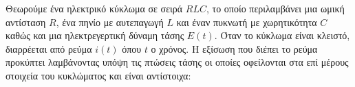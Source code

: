 \documentclass[a4paper,table]{report}
\begin{document}

\begin{center}
  \minibox{\large\bfseries \textcolor{Col1}{Κύκλωμα $ RLC $}}
\end{center}

\vspace{\baselineskip} 


Θεωρούμε ένα ηλεκτρικό κύκλωμα σε σειρά $RLC$, το οποίο περιλαμβάνει μια ωμική αντίσταση 
$R$, ένα πηνίο με αυτεπαγωγή $ L $ και έναν πυκνωτή με χωρητικότητα $ C $ καθώς και μια 
ηλεκτρεγερτική δύναμη τάσης $ E(t) $. Όταν το κύκλωμα είναι κλειστό, διαρρέεται από 
ρεύμα $ i(t) $ όπου $t$ ο χρόνος. Η εξίσωση που διέπει το ρεύμα προκύπτει λαμβάνοντας 
υπόψη τις πτώσεις τάσης οι οποίες οφείλονται στα επί μέρους στοιχεία του κυκλώματος και 
είναι αντίστοιχα:
\end{document}
